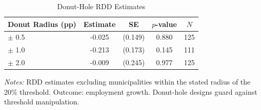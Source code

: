 \begin{table}[htbp]
\centering
\caption{Donut-Hole RDD Estimates}
\label{tab:donut}
\begin{tabular}{lcccc}
\toprule
Donut Radius (pp) & Estimate & SE & $p$-value & $N$ \\
\midrule
$\pm$ 0.5 & -0.025 & (0.149) & 0.880 & 125 \\
$\pm$ 1.0 & -0.213 & (0.173) & 0.145 & 111 \\
$\pm$ 2.0 & -0.009 & (0.245) & 0.977 & 125 \\
\bottomrule
\end{tabular}
\begin{minipage}{0.85\textwidth}
\vspace{0.3em}
\footnotesize \textit{Notes:} RDD estimates excluding municipalities within the stated radius of the 20\% threshold.
Outcome: employment growth. Donut-hole designs guard against threshold manipulation.
\end{minipage}
\end{table}

